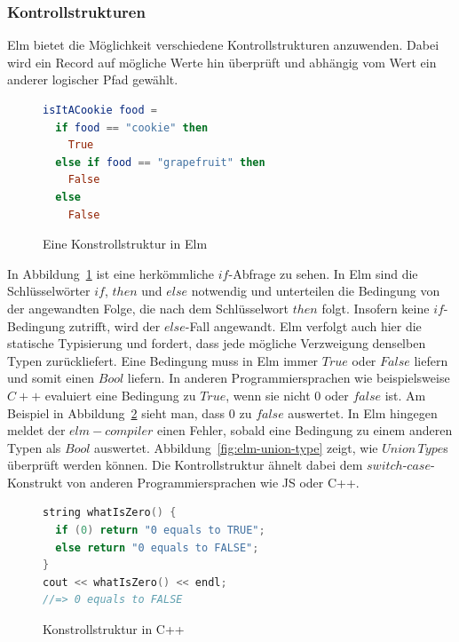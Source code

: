 \subsubsection{Kontrollstrukturen}
\label{sec:Kontrollstrukturen}
Elm bietet die Möglichkeit verschiedene Kontrollstrukturen anzuwenden. Dabei wird ein Record auf mögliche Werte hin überprüft und abhängig vom Wert ein anderer logischer Pfad gewählt.
\begin{figure}[h]
\begin{lstlisting}[language=Elm]
isItACookie food =
  if food == "cookie" then
  	True
  else if food == "grapefruit" then
    False
  else
    False
\end{lstlisting}
\caption{Eine Konstrollstruktur in Elm}\label{fig:elm-conditional}
\end{figure}
In Abbildung~\ref{fig:elm-conditional} ist eine herkömmliche $if$-Abfrage zu sehen. In Elm sind die Schlüsselwörter $if$, $then$ und $else$ notwendig und unterteilen die Bedingung von der angewandten Folge, die nach dem Schlüsselwort $then$ folgt. Insofern keine $if$-Bedingung zutrifft, wird der $else$-Fall angewandt.
Elm verfolgt auch hier die statische Typisierung und fordert, dass jede mögliche Verzweigung denselben Typen zurückliefert. Eine Bedingung muss in Elm immer $True$ oder $False$ liefern und somit einen $Bool$ liefern. In anderen Programmiersprachen wie beispielsweise $C++$ evaluiert eine Bedingung zu $True$, wenn sie nicht $0$ oder $false$ ist. Am Beispiel in Abbildung~\ref{fig:cpp-conditional} sieht man, dass $0$ zu $false$ auswertet. In Elm hingegen meldet der $elm-compiler$ einen Fehler, sobald eine Bedingung zu einem anderen Typen als $Bool$ auswertet.
Abbildung~\ref{fig:elm-union-type} zeigt, wie $Union\,Type$s überprüft werden können. Die Kontrollstruktur ähnelt dabei dem $switch$-$case$-Konstrukt von anderen Programmiersprachen wie \ac{JS} oder C++.
\begin{figure}[h]
\begin{lstlisting}[language=c++]
string whatIsZero() {
  if (0) return "0 equals to TRUE";
  else return "0 equals to FALSE";
}
cout << whatIsZero() << endl;
//=> 0 equals to FALSE

\end{lstlisting}
\caption{Konstrollstruktur in C++}\label{fig:cpp-conditional}
\end{figure}


